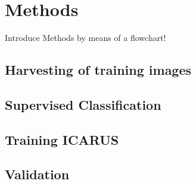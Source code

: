 \section{Methods}
	Introduce Methods by means of a flowchart!
		\subsection{Harvesting of training images}
		\subsection{Supervised Classification}
		\subsection{Training ICARUS}
		\subsection{Validation}
			\cite{hilbert2016}